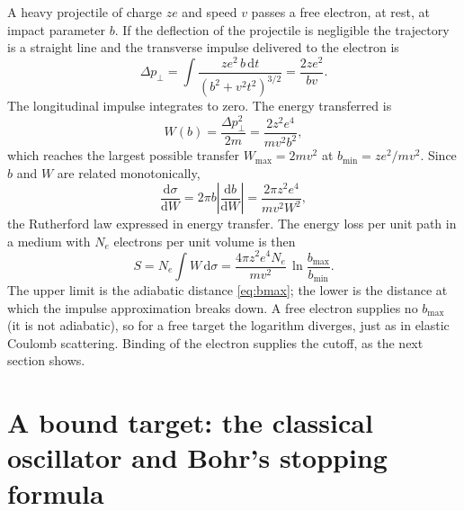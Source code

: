 \documentclass[11pt,a4paper]{book}
\numberwithin{equation}{chapter}
\newcommand{\dd}{\mathrm{d}}
\begin{document}
A heavy projectile of charge $ze$ and speed $v$ passes a free electron, at rest,
at impact parameter $b$. If the deflection of the projectile is negligible the
trajectory is a straight line and the transverse impulse delivered to the
electron is
\begin{equation}\label{eq:impulse}
  \Delta p_\perp=\int\frac{ze^2\,b\,\dd t}{(b^2+v^2t^2)^{3/2}}=\frac{2ze^2}{bv}.
\end{equation}
The longitudinal impulse integrates to zero. The energy transferred is
\begin{equation}\label{eq:Wb}
  W(b)=\frac{\Delta p_\perp^2}{2m}=\frac{2z^2e^4}{mv^2b^2},
\end{equation}
which reaches the largest possible transfer $W_{\max}=2mv^2$ at
$b_{\min}=ze^2/mv^2$. Since $b$ and $W$ are related monotonically,
\begin{equation}\label{eq:dsdW}
  \frac{\dd\sigma}{\dd W}=2\pi b\left|\frac{\dd b}{\dd W}\right|=\frac{2\pi z^2e^4}{mv^2W^2},
\end{equation}
the Rutherford law expressed in energy transfer. The energy loss per unit path in
a medium with $N_e$ electrons per unit volume is then
\begin{equation}\label{eq:S-free}
  S=N_e\!\int W\,\dd\sigma=\frac{4\pi z^2e^4N_e}{mv^2}\,\ln\frac{b_{\max}}{b_{\min}} .
\end{equation}
The upper limit is the adiabatic distance \eqref{eq:bmax}; the lower is the
distance at which the impulse approximation breaks down. A free electron
supplies no $b_{\max}$ (it is not adiabatic), so for a free target the logarithm
diverges, just as in elastic Coulomb scattering. Binding of the electron supplies
the cutoff, as the next section shows.

\section{A bound target: the classical oscillator and Bohr's stopping formula}
\end{document}
